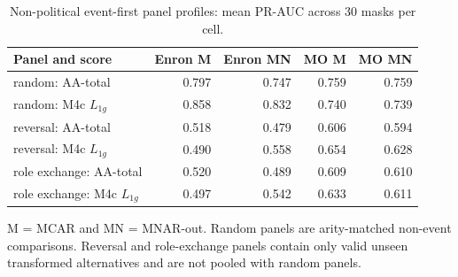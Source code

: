 \begin{table}[tbp]
\centering
\small
\caption{Non-political event-first panel profiles: mean PR-AUC across 30 masks per cell.}
\label{tab:scope-panels}
\begin{tabular}{lrrrr}
\toprule
Panel and score & Enron M & Enron MN & MO M & MO MN \\
\midrule
random: AA-total & 0.797 & 0.747 & 0.759 & 0.759 \\
random: M4c $L_{1g}$ & 0.858 & 0.832 & 0.740 & 0.739 \\
reversal: AA-total & 0.518 & 0.479 & 0.606 & 0.594 \\
reversal: M4c $L_{1g}$ & 0.490 & 0.558 & 0.654 & 0.628 \\
role exchange: AA-total & 0.520 & 0.489 & 0.609 & 0.610 \\
role exchange: M4c $L_{1g}$ & 0.497 & 0.542 & 0.633 & 0.611 \\
\bottomrule
\end{tabular}
\par\vspace{2pt}\footnotesize M = MCAR and MN = MNAR-out. Random panels are arity-matched non-event comparisons. Reversal and role-exchange panels contain only valid unseen transformed alternatives and are not pooled with random panels.
\end{table}
